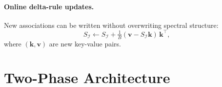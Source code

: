 \documentclass[11pt,a4paper]{article}
\newcommand{\I}{\mathcal{I}}
\begin{document}
\paragraph{Online delta-rule updates.}
New associations can be written without overwriting spectral structure:
\begin{equation}
  S_{\I} \leftarrow S_{\I} + \tfrac{1}{B}(\bm{v}-S_{\I}\bm{k})\,\bm{k}^\top,
  \label{eq:delta_rule}
\end{equation}
where $(\bm{k},\bm{v})$ are new key-value pairs.

\section{Two-Phase Architecture}
\label{sec:two_phase}
\end{document}
